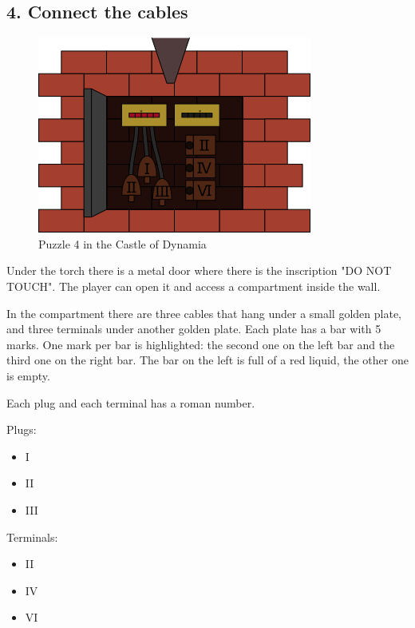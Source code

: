 \subsection{4. Connect the cables}

\begin{figure}[H]
  \centering
  \includegraphics[width=\textwidth]{Images/Puzzles/castleOfDynamia4}
  \caption{Puzzle 4 in the Castle of Dynamia}
\end{figure}


Under the torch there is a metal door where there is the inscription "DO NOT TOUCH". The player can open it and access a compartment inside the wall.

In the compartment there are three cables that hang under a small golden plate, and three terminals under another golden plate. Each plate has a bar with 5 marks. One mark per bar is highlighted: the second one on the left bar and the third one on the right bar. The bar on the left is full of a red liquid, the other one is empty.

Each plug and each terminal has a roman number.

Plugs:
\begin{itemize}
	\item I
	\item II
	\item III
\end{itemize}

Terminals:
\begin{itemize}
	\item II
	\item IV
	\item VI
\end{itemize}

